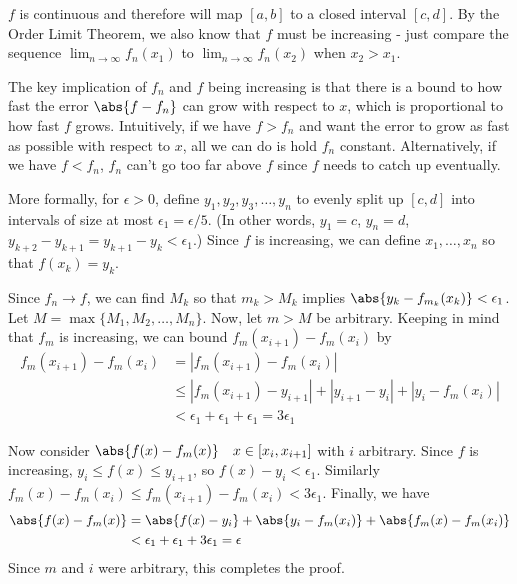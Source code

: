 \begin{solution}
\(f\) is continuous and therefore will map \([a, b]\) to a closed interval \([c, d]\). By the Order Limit Theorem, we also know that \(f\) must be increasing - just compare the sequence \(\lim_{n \to \infty} f_n(x_1)\) to \(\lim_{n \to \infty} f_n(x_2)\) when \(x_2 > x_1\).

The key implication of \(f_n\) and \(f\) being increasing is that there is a bound to how fast the error \(\abs{f - f_n}\) can grow with respect to \(x\), which is proportional to how fast \(f\) grows. Intuitively, if we have \(f > f_n\) and want the error to grow as fast as possible with respect to \(x\), all we can do is hold \(f_n\) constant. Alternatively, if we have \(f < f_n\), \(f_n\) can't go too far above \(f\) since \(f\) needs to catch up eventually.

More formally, for \(\epsilon > 0\), define \(y_1, y_2, y_3, \dots, y_n\) to evenly split up \([c, d]\) into intervals of size at most \(\epsilon_1 = \epsilon / 5\). (In other words, \(y_1 = c\), \(y_n=d\), \(y_{k+2} - y_{k+1} = y_{k+1} - y_k < \epsilon_1\).) Since \(f\) is increasing, we can define \(x_1, \dots, x_n\) so that \(f(x_k) = y_k\).

Since \(f_n \to f\), we can find \(M_k\) so that \(m_k > M_k\) implies \(\abs{y_k - f_{m_k}(x_k)} < \epsilon_1\). Let \(M = \max\{M_1, M_2, \dots, M_n\}\). Now, let \(m > M\) be arbitrary.
 Keeping in mind that \(f_m\) is increasing, we can bound \(f_m(x_{i+1}) - f_m(x_i)\) by
\[ \begin{aligned}
f_m(x_{i+1}) - f_m(x_i) &= |f_m(x_{i+1}) - f_m(x_i)| \\
    &\leq |f_m(x_{i+1}) - y_{i+1}| + |y_{i+1} - y_i| + |y_i - f_m(x_i)| \\
    &< \epsilon_1 + \epsilon_1 + \epsilon_1 = 3 \epsilon_1
\end{aligned} \]

Now consider \(\abs{f(x) - f_m(x)} \quad x \in [x_i, x_{i+1}]\) with \(i\) arbitrary.
 Since \(f\) is increasing, \(y_i \leq f(x) \leq y_{i+1}\), so \(f(x) - y_i < \epsilon_1\). Similarly \(f_m(x) - f_m(x_i) \leq f_m(x_{i+1}) - f_m(x_i) < 3\epsilon_1\). Finally, we have
 \[\begin{aligned}
 \abs{f(x) - f_m(x)} &= \abs{f(x) - y_i} + \abs{y_i - f_m(x_i)} + \abs{f_m(x) - f_m(x_i)} \\
 &< \epsilon_1 + \epsilon_1 + 3\epsilon_1 = \epsilon
 \end{aligned} \]
 Since \(m\) and \(i\) were arbitrary, this completes the proof.
\end{solution}

